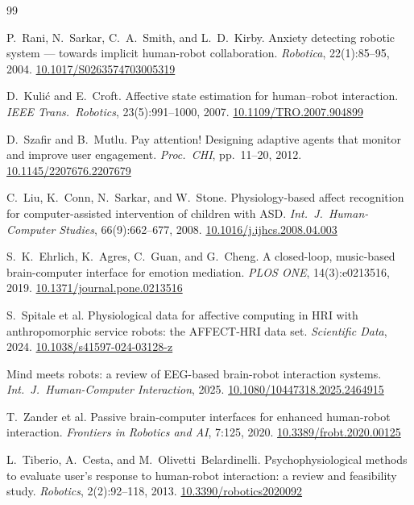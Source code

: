\documentclass[11pt,a4paper]{article}
\begin{document}
\begin{thebibliography}{99}
\small

P.~Rani, N.~Sarkar, C.~A.~Smith, and L.~D.~Kirby.
Anxiety detecting robotic system --- towards implicit human-robot collaboration.
\emph{Robotica}, 22(1):85--95, 2004.
\href{https://doi.org/10.1017/S0263574703005319}{10.1017/S0263574703005319}

D.~Kuli\'{c} and E.~Croft.
Affective state estimation for human--robot interaction.
\emph{IEEE Trans.\ Robotics}, 23(5):991--1000, 2007.
\href{https://doi.org/10.1109/TRO.2007.904899}{10.1109/TRO.2007.904899}

D.~Szafir and B.~Mutlu.
Pay attention! Designing adaptive agents that monitor and improve user engagement.
\emph{Proc.\ CHI}, pp.\ 11--20, 2012.
\href{https://doi.org/10.1145/2207676.2207679}{10.1145/2207676.2207679}

C.~Liu, K.~Conn, N.~Sarkar, and W.~Stone.
Physiology-based affect recognition for computer-assisted intervention of children with ASD.
\emph{Int.\ J.\ Human-Computer Studies}, 66(9):662--677, 2008.
\href{https://doi.org/10.1016/j.ijhcs.2008.04.003}{10.1016/j.ijhcs.2008.04.003}

S.~K.~Ehrlich, K.~Agres, C.~Guan, and G.~Cheng.
A closed-loop, music-based brain-computer interface for emotion mediation.
\emph{PLOS ONE}, 14(3):e0213516, 2019.
\href{https://doi.org/10.1371/journal.pone.0213516}{10.1371/journal.pone.0213516}

S.~Spitale et al.
Physiological data for affective computing in HRI with anthropomorphic service robots: the AFFECT-HRI data set.
\emph{Scientific Data}, 2024.
\href{https://doi.org/10.1038/s41597-024-03128-z}{10.1038/s41597-024-03128-z}

Mind meets robots: a review of EEG-based brain-robot interaction systems.
\emph{Int.\ J.\ Human-Computer Interaction}, 2025.
\href{https://doi.org/10.1080/10447318.2025.2464915}{10.1080/10447318.2025.2464915}

T.~Zander et al.
Passive brain-computer interfaces for enhanced human-robot interaction.
\emph{Frontiers in Robotics and AI}, 7:125, 2020.
\href{https://doi.org/10.3389/frobt.2020.00125}{10.3389/frobt.2020.00125}

L.~Tiberio, A.~Cesta, and M.~Olivetti~Belardinelli.
Psychophysiological methods to evaluate user's response to human-robot interaction: a review and feasibility study.
\emph{Robotics}, 2(2):92--118, 2013.
\href{https://doi.org/10.3390/robotics2020092}{10.3390/robotics2020092}

\end{thebibliography}
\end{document}
